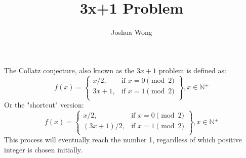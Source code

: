 \documentclass[a4paper,10pt]{article}
\title{3x+1 Problem}
\author{Joshua Wong}
\begin{document}
\maketitle
    The Collatz conjecture, also known as the \(3x+1\) problem is defined as:
  \[
    f(x) = \left.
    \begin{cases}
        x/2, & \text{if } x = 0 {\pmod {2}}\\
        3x+1, & \text{if } x = 1 {\pmod {2}} \\
        \end{cases}
    \right\}, x \in \mathbb{N{^+}}
  \]
  Or the "shortcut" version:
  \[
    f(x) = \left.
    \begin{cases}
        x/2, & \text{if } x = 0 {\pmod {2}}\\
        (3x+1)/2, & \text{if } x = 1 {\pmod {2}} \\
        \end{cases}
    \right\}, x \in \mathbb{N{^+}}
  \]
  This process will eventually reach the number 1, regardless of which positive integer is chosen initially. \\ \\
\end{document}
